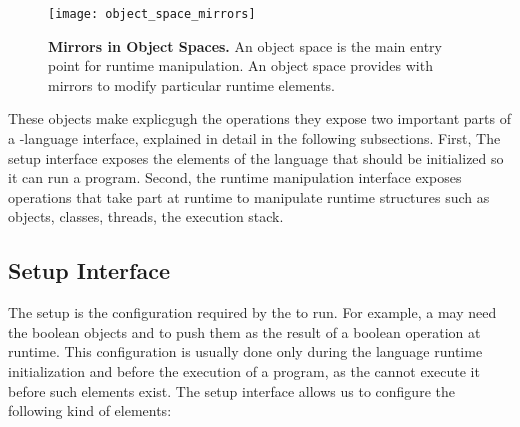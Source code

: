\begin{figure}[htb]
\begin{center}
\texttt{[image: object\_space\_mirrors]}
\caption{\textbf{Mirrors in Object Spaces.} An object space is the main entry point for runtime manipulation. An object space provides with mirrors to modify particular runtime elements. \label{fig:objectSpaceMirrors}}
\end{center}
\end{figure}

These objects make explicgugh the operations they expose two important parts of a \VM-language interface, explained in detail in the following subsections. First, The \VM setup interface exposes the elements of the language that should be initialized so it can run a program. Second, the runtime manipulation interface exposes operations that take part at runtime to manipulate runtime structures such as objects, classes, threads, the execution stack.

\subsection{\VM Setup Interface}

The \VM setup is the configuration required by the \VM to run.
For example, a \VM may need the boolean objects  and  to push them as the result of a boolean operation at runtime.
This configuration is usually done only during the language runtime initialization and before the execution of a program, as the \VM cannot execute it before such elements exist.
The \VM setup interface allows us to configure the following kind of elements:

